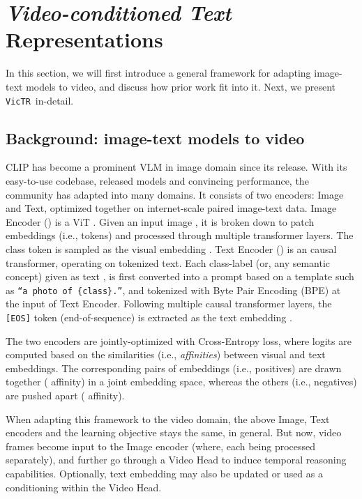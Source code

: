 \documentclass[10pt,twocolumn,letterpaper]{article}
\newcommand{\ours}{\texttt{VicTR}}
\begin{document}
\section{\textit{Video-conditioned Text} Representations}
\label{sec:method}

In this section, we will first introduce a general framework for adapting image-text models to video, and discuss how prior work fit into it. Next, we present \ours~in-detail.

\subsection{Background: image-text models to video}

CLIP \cite{radford2021clip} has become a prominent VLM in image domain since its release. With its easy-to-use codebase, released models and convincing performance, the community has adapted into many domains. It consists of two encoders: Image and Text, optimized together on internet-scale paired image-text data. Image Encoder () is a ViT \cite{dosovitskiy2020vit}. Given an input image , it is broken down to patch embeddings (i.e., tokens) and processed through multiple transformer layers. The class token  is sampled as the visual embedding . Text Encoder () is an causal transformer, operating on tokenized text. Each class-label (or, any semantic concept) given as text , is first converted into a prompt based on a template such as \texttt{``a photo of \{class\}.''}, and tokenized with Byte Pair Encoding (BPE) \cite{sennrich2015neural} at the input of Text Encoder. Following multiple causal transformer layers, the \texttt{[EOS]} token (end-of-sequence) is extracted as the text embedding . 

The two encoders are jointly-optimized with Cross-Entropy loss, where logits are computed based on the similarities (i.e., \textit{affinities}) between visual and text embeddings. The corresponding pairs of embeddings (i.e., positives) are drawn together ( affinity) in a joint embedding space, whereas the others (i.e., negatives) are pushed apart ( affinity).


When adapting this framework to the video domain, the above Image, Text encoders and the learning objective stays the same, in general. But now, video frames  become input to the Image encoder (where, each being processed separately), and further go through a Video Head  to induce temporal reasoning capabilities. Optionally, text embedding  may also be updated or used as a conditioning within the Video Head.
\end{document}

